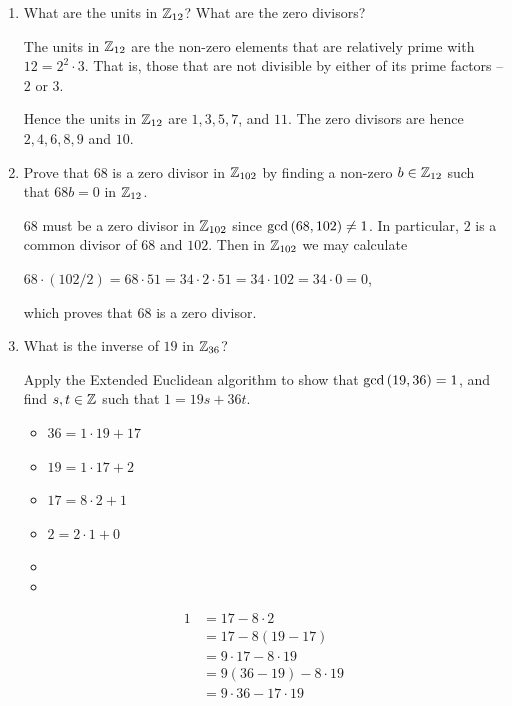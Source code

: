 \documentclass[11pt,fleqn,dvipsnames,usenames]{article}
\begin{document}
\begin{enumerate}

\item What are the units in $\mathbb{Z}_{12}$?  What are the zero divisors?
\vsmsp

\solution The units in $\mathbb{Z}_{12}$ are the non-zero elements that are relatively prime with $12 = 2^2\cdot 3$.  That is, those that are not divisible by either of its prime factors -- $2$ or $3$.
\vsmsp

Hence the units in $\mathbb{Z}_{12}$ are $1, 3, 5, 7$, and $11$.  The zero divisors are hence $2,4,6,8,9$ and $10$.
\item Prove that $68$ is a zero divisor in $\mathbb{Z}_{102}$ by finding a non-zero $b\in\mathbb{Z}_{12}$ such that $68b = 0$ in $\mathbb{Z}_{12}$.
\vsmsp

\solution $68$ must be a zero divisor in $\mathbb{Z}_{102}$ since $\text{gcd}\left(68,102\right)\neq 1$.  In particular, $2$ is a common divisor of $68$ and $102$.  Then in $\mathbb{Z}_{102}$ we may calculate
\begin{center}
$68\cdot (102/2) = 68\cdot 51 = 34\cdot 2\cdot 51 = 34\cdot 102 = 34\cdot 0 = 0$,
\end{center}
which proves that $68$ is a zero divisor.

\item What is the inverse of $19$ in $\mathbb{Z}_{36}$?
\vsmsp

\solution Apply the Extended Euclidean algorithm to show that $\text{gcd}\left(19,36\right) = 1$, and find $s,t\in\mathbb{Z}$ such that $1 = 19s + 36t$.
\begin{multicols}{2}
\begin{itemize}[\ ]
\item $36 = 1\cdot 19 + 17$
\item $19 = 1\cdot 17 + 2$
\item $17 = 8\cdot 2 + 1$
\item $2 = 2\cdot 1 + 0$
\item
\item
\end{itemize}
\columnbreak
\begin{align*}
1 &= 17 - 8\cdot 2\\
&= 17 - 8(19 - 17)\\
&= 9\cdot 17 - 8\cdot 19\\
&= 9(36 - 19) - 8\cdot 19\\
&= 9\cdot 36 - 17\cdot 19
\end{align*}
\end{multicols}
\vspace{-0.5cm}


\end{enumerate}
\end{document}
